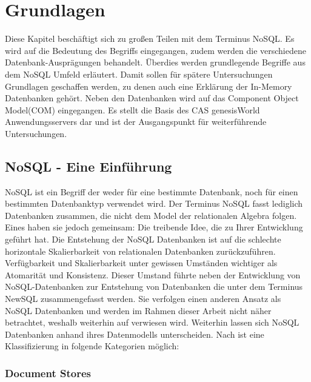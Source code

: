 
\chapter{Grundlagen}
\label{ch:grundlagen}

Diese Kapitel beschäftigt sich zu großen Teilen mit dem Terminus NoSQL. Es wird auf die Bedeutung des Begriffs eingegangen, zudem werden die verschiedene Datenbank-Ausprägungen behandelt. Überdies werden grundlegende Begriffe aus dem NoSQL Umfeld erläutert. Damit sollen für spätere Untersuchungen Grundlagen geschaffen werden, zu denen auch eine Erklärung der In-Memory Datenbanken gehört. Neben den Datenbanken wird auf das Component Object Model(COM) eingegangen. Es stellt die Basis des CAS genesisWorld Anwendungsservers dar und ist der Ausgangspunkt für weiterführende Untersuchungen.

\section{NoSQL - Eine Einführung}
\label{ch:grundlagen:sec:NoSQL}

NoSQL ist ein Begriff der weder für eine bestimmte Datenbank, noch für einen bestimmten Datenbanktyp verwendet wird. Der Terminus NoSQL fasst lediglich Datenbanken zusammen, die nicht dem Model der relationalen Algebra folgen. Eines haben sie jedoch gemeinsam: Die treibende Idee, die zu Ihrer Entwicklung geführt hat. Die Entstehung der NoSQL Datenbanken ist auf die schlechte horizontale Skalierbarkeit von relationalen Datenbanken zurückzuführen. Verfügbarkeit und Skalierbarkeit unter gewissen Umständen wichtiger als Atomarität und Konsistenz. Dieser Umstand führte neben der Entwicklung von NoSQL-Datenbanken zur Entstehung von Datenbanken die unter dem Terminus NewSQL zusammengefasst werden. Sie verfolgen einen anderen Ansatz als NoSQL Datenbanken und werden im Rahmen dieser Arbeit nicht näher betrachtet, weshalb weiterhin auf \cite{NewSQL2011} verwiesen wird. Weiterhin lassen sich NoSQL Datenbanken anhand ihres Datenmodells unterscheiden. Nach \cite{vaish2013getting} ist eine Klassifizierung in folgende Kategorien möglich:

\subsection{Document Stores}
\label{ch:grundlagen:sec:NoSQL:DocumentStores}

